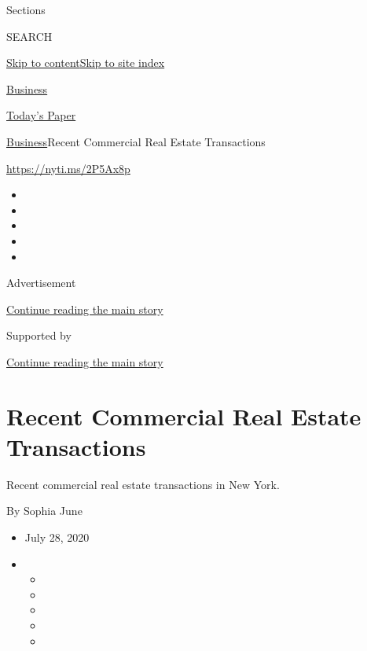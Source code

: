 Sections

SEARCH

\protect\hyperlink{site-content}{Skip to
content}\protect\hyperlink{site-index}{Skip to site index}

\href{https://www.nytimes.com/section/business}{Business}

\href{https://myaccount.nytimes.com/auth/login?response_type=cookie\&client_id=vi}{}

\href{https://www.nytimes.com/section/todayspaper}{Today's Paper}

\href{/section/business}{Business}\textbar{}Recent Commercial Real
Estate Transactions

\url{https://nyti.ms/2P5Ax8p}

\begin{itemize}
\item
\item
\item
\item
\item
\end{itemize}

Advertisement

\protect\hyperlink{after-top}{Continue reading the main story}

Supported by

\protect\hyperlink{after-sponsor}{Continue reading the main story}

\hypertarget{recent-commercial-real-estate-transactions}{%
\section{Recent Commercial Real Estate
Transactions}\label{recent-commercial-real-estate-transactions}}

Recent commercial real estate transactions in New York.

By Sophia June

\begin{itemize}
\item
  July 28, 2020
\item
  \begin{itemize}
  \item
  \item
  \item
  \item
  \item
  \end{itemize}
\end{itemize}

